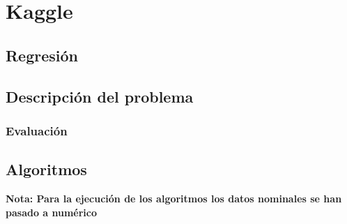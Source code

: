 \chapter[Kaggle]
{Kaggle}
\section{Regresión}
\section{Descripción del problema}
\subsection{Evaluación}
\section{Algoritmos}
\textbf{Nota: Para la ejecución de los algoritmos los datos nominales se han pasado a numérico}

